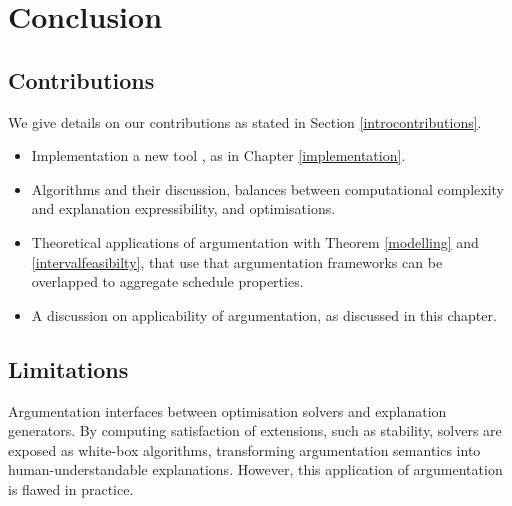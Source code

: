 \chapter{Conclusion}

\section{Contributions}
We give details on our contributions as stated in Section \ref{introcontributions}.

\begin{itemize}
	\item Implementation a new tool \emph{\toolname}, as in Chapter \ref{implementation}.
	\item Algorithms and their discussion, balances between computational complexity and explanation expressibility, and optimisations.
	\item Theoretical applications of argumentation with Theorem \ref{modelling} and \ref{intervalfeasibilty}, that use that argumentation frameworks can be overlapped to aggregate schedule properties.
	\item A discussion on applicability of argumentation, as discussed in this chapter.
\end{itemize}

\section{Limitations}

Argumentation interfaces between optimisation solvers and explanation generators. By computing satisfaction of extensions, such as stability, solvers are exposed as white-box algorithms, transforming argumentation semantics into human-understandable explanations. However, this application of argumentation is flawed in practice. 

